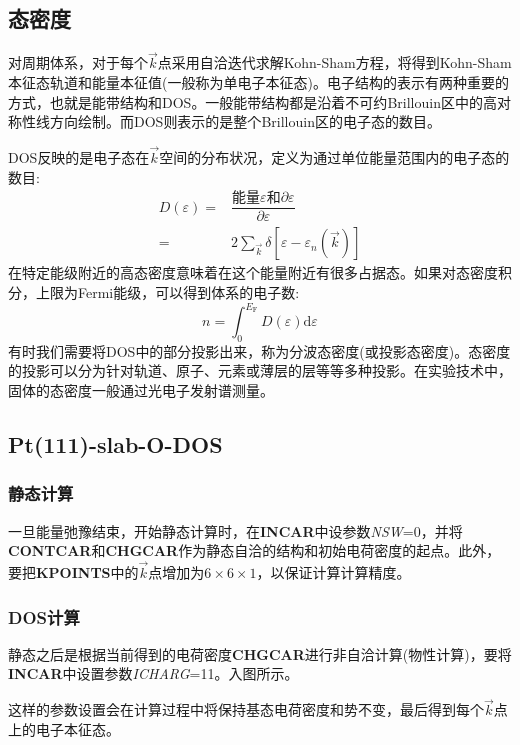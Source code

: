 \subsection{态密度}
对周期体系，对于每个$\vec k$点采用自洽迭代求解\textrm{Kohn-Sham}方程，将得到\textrm{Kohn-Sham}本征态轨道和能量本征值(一般称为单电子本征态)。电子结构的表示有两种重要的方式，也就是能带结构和\textrm{DOS}。一般能带结构都是沿着不可约\textrm{Brillouin}区中的高对称性线方向绘制。而\textrm{DOS}则表示的是整个\textrm{Brillouin}区的电子态的数目。

\textrm{DOS}反映的是电子态在$\vec k$空间的分布状况，定义为通过单位能量范围内的电子态的数目:
\begin{equation}
	\begin{aligned}
		D(\varepsilon)=&\dfrac{\mbox{能量}\varepsilon\mbox{和}\partial\varepsilon}{\partial\varepsilon}\\
		=&2\sum_{\vec k}\delta[\varepsilon-\varepsilon_n(\vec k)]
	\end{aligned}
	\label{eq:DOS}
\end{equation}
在特定能级附近的高态密度意味着在这个能量附近有很多占据态。如果对态密度积分，上限为\textrm{Fermi}能级，可以得到体系的电子数:~
\begin{equation}
	n=\int_0^{E_{\mathrm{F}}}D(\varepsilon)\mathrm{d}\varepsilon
	\label{eq:DOS-integral}
\end{equation}
有时我们需要将\textrm{DOS}中的部分投影出来，称为分波态密度(或投影态密度)。态密度的投影可以分为针对轨道、原子、元素或薄层的层等等多种投影。在实验技术中，固体的态密度一般通过光电子发射谱测量。
\subsection{\rm{Pt(111)-slab-O-DOS}}
\subsubsection{静态计算}
一旦能量弛豫结束，开始静态计算时，在\textbf{INCAR}中设参数\textit{NSW}=0，并将\textbf{CONTCAR}和\textbf{CHGCAR}作为静态自洽的结构和初始电荷密度的起点。此外，要把\textbf{KPOINTS}中的$\vec k$点增加为$6\times6\times1$，以保证计算计算精度。
\subsubsection{\rm{DOS}计算}
静态之后是根据当前得到的电荷密度\textbf{CHGCAR}进行非自洽计算(物性计算)，要将\textbf{INCAR}中设置参数\textit{ICHARG}=11。入图所示。

这样的参数设置会在计算过程中将保持基态电荷密度和势不变，最后得到每个$\vec k$点上的电子本征态。
